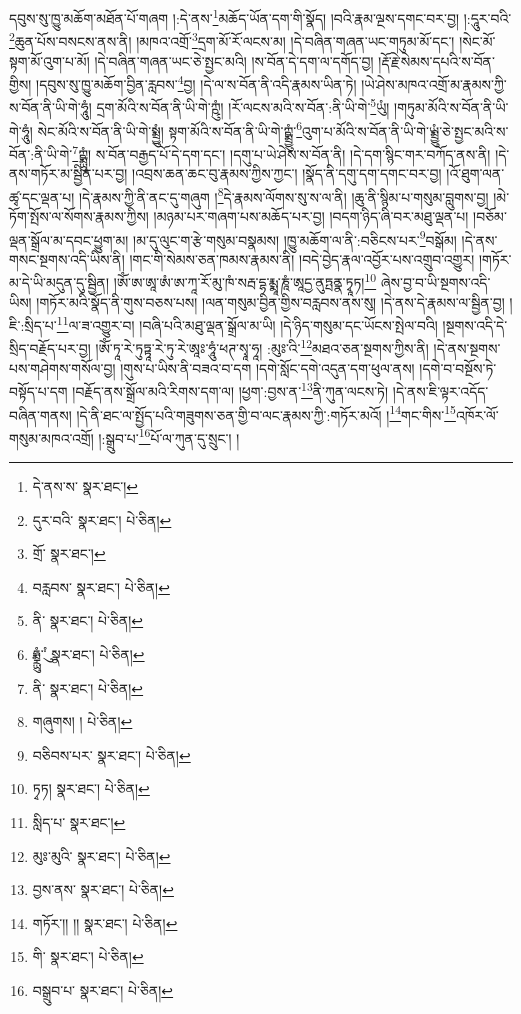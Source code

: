 དབུས་སུ་ཁྱུ་མཆོག་མཐོན་པོ་གཞག །:དེ་ནས་\footnote{དེ་ནས་ས་  སྣར་ཐང་། }མཆོད་ཡོན་དག་གི་སྣོད། །བའི་རྣམ་ལྔས་དགང་བར་བྱ། །:དཱུར་བའི་\footnote{དུར་བའི་  སྣར་ཐང་།  པེ་ཅིན། }ཆུན་པོས་བསངས་ནས་ནི། །མཁའ་འགྲོ་\footnote{གྲོ་  སྣར་ཐང་། }དྲག་མོ་རོ་ལངས་མ། །དེ་བཞིན་གཞན་ཡང་གཏུམ་མོ་དང་། །སེང་མོ་སྟག་མོ་འུག་པ་མོ། །དེ་བཞིན་གཞན་ཡང་ཅེ་སྤྱང་མའི། །ས་བོན་དེ་དག་ལ་དགོད་བྱ། །རྡོ་རྗེ་སེམས་དཔའི་ས་བོན་གྱིས། །དབུས་སུ་ཁྱུ་མཆོག་བྱིན་རླབས་\footnote{བརླབས་  སྣར་ཐང་།  པེ་ཅིན། }བྱ། །དེ་ལ་ས་བོན་ནི་འདི་རྣམས་ཡིན་ཏེ། །ཡེ་ཤེས་མཁའ་འགྲོ་མ་རྣམས་ཀྱི་ས་བོན་ནི་ཡི་གེ་ཧཱུཾ། དྲག་མོའི་ས་བོན་ནི་ཡི་གེ་ཀྵུཾ། །རོ་ལངས་མའི་ས་བོན་:ནི་ཡི་གེ་\footnote{ནི་  སྣར་ཐང་།  པེ་ཅིན། }ཡུཾ། །གཏུམ་མོའི་ས་བོན་ནི་ཡི་གེ་ཧཱུཾ། སེང་མོའི་ས་བོན་ནི་ཡི་གེ་སྨྲྱུཾ། སྟག་མོའི་ས་བོན་ནི་ཡི་གེ་ཀྵྨྲྱུཾ་\footnote{ཧྨྼྻུཾ་ུཾ་  སྣར་ཐང་།  པེ་ཅིན། }འུག་པ་མོའི་ས་བོན་ནི་ཡི་གེ་ཡྨྲྱུཾ་ཅེ་སྤྱང་མའི་ས་བོན་:ནི་ཡི་གེ་\footnote{ནི་  སྣར་ཐང་།  པེ་ཅིན། }ཀྵྨྻུཾ། ས་བོན་བརྒྱད་པོ་དེ་དག་དང་། །དགུ་པ་ཡེ་ཤེས་ས་བོན་ནི། །དེ་དག་སྙིང་གར་བཀོད་ནས་ནི། །དེ་ནས་གཏོར་མ་སྦྱིན་པར་བྱ། །འབྲས་ཆན་ཆང་བུ་རྣམས་ཀྱིས་ཀྱང་། །སྣོད་ནི་དགུ་དག་དགང་བར་བྱ། །འོ་ཐུག་ལན་ཚྭ་དང་ལྡན་པ། །དེ་རྣམས་ཀྱི་ནི་ནང་དུ་གཞུག །\footnote{གཞུགས། །  པེ་ཅིན། }དེ་རྣམས་ལོགས་སུ་ས་ལ་ནི། །ཆུ་ནི་སྙིམ་པ་གསུམ་བླུགས་བྱ། །མེ་ཏོག་སྤོས་ལ་སོགས་རྣམས་ཀྱིས། །མཉམ་པར་གཞག་པས་མཆོད་པར་བྱ། །བདག་ཉིད་ཞི་བར་མཐུ་ལྡན་པ། །བཅོམ་ལྡན་སྒྲོལ་མ་དབང་ཕྱུག་མ། །མ་དུ་ལུང་ག་རྩེ་གསུམ་བསྣམས། །ཁྱུ་མཆོག་ལ་ནི་:བཅིངས་པར་\footnote{བཅིབས་པར་  སྣར་ཐང་།  པེ་ཅིན། }བསྒོམ། །དེ་ནས་གསང་སྔགས་འདི་ཡིས་ནི། །གང་གི་སེམས་ཅན་ཁམས་རྣམས་ནི། །བདེ་བྱེད་རྣལ་འབྱོར་པས་འགྲུབ་འགྱུར། །གཏོར་མ་དེ་ཡི་མདུན་དུ་སྦྱིན། །ཨོཾ་ཨ་ཨཱ་ཨཾ་ཨ་ཀཱ་རོ་མུ་ཁཾ་སརྦ་དྷ་རྨྨཱ་ཎཱཾ་ཨཱདྱ་ནུཏྤནྣ་ཏྭཱཏ།\footnote{ཏྭཏ།  སྣར་ཐང་།  པེ་ཅིན། } ཞེས་བྱ་བ་ཡི་སྔགས་འདི་ཡིས། །གཏོར་མའི་སྣོད་ནི་གུས་བཅས་པས། །ལན་གསུམ་བྱིན་གྱིས་བརླབས་ནས་སུ། །དེ་ནས་དེ་རྣམས་ལ་སྦྱིན་བྱ། །ཇི་:སྲིད་པ་\footnote{སླིད་པ་  སྣར་ཐང་། }ལ་ཟ་འགྱུར་བ། །བཞི་པའི་མཐུ་ལྡན་སྒྲོལ་མ་ཡི། །དེ་ཉིད་གསུམ་དང་ཡོངས་སྤེལ་བའི། །སྔགས་འདི་དེ་སྲིད་བརྗོད་པར་བྱ། །ཨོཾ་ཏཱ་རེ་ཏུཏྟཱ་རེ་ཏུ་རེ་ཨཱཿ་ཧཱུཾ་ཕཊ་སྭཱ་ཧཱ། :མུཿ་འི་\footnote{མུཿ་མུའི་  སྣར་ཐང་།  པེ་ཅིན། }མཐའ་ཅན་སྔགས་ཀྱིས་ནི། །དེ་ནས་སྔགས་པས་གཤེགས་གསོལ་བྱ། །གུས་པ་ཡིས་ནི་བཟའ་བ་དག །དགེ་སློང་དགེ་འདུན་དག་ཕུལ་ནས། །དགེ་བ་བསྔོས་ཏེ་བསྟོད་པ་དག །བརྗོད་ནས་སྒྲོལ་མའི་རིགས་དག་ལ། །ཕྱག་:བྱས་ན་\footnote{བྱས་ནས་  སྣར་ཐང་།  པེ་ཅིན། }ནི་ཀུན་ལངས་ཏེ། །དེ་ནས་ཇི་ལྟར་འདོད་བཞིན་གནས། །དེ་ནི་ཐང་ལ་སྤྱོད་པའི་གཟུགས་ཅན་གྱི་བ་ལང་རྣམས་ཀྱི་:གཏོར་མའོ། །\footnote{གཏོར་།། །།  སྣར་ཐང་།  པེ་ཅིན། }གང་གིས་\footnote{གི་  སྣར་ཐང་།  པེ་ཅིན། }འཁོར་ལོ་གསུམ་མཁའ་འགྲོ། །:སྒྲུབ་པ་\footnote{བསྒྲུབ་པ་  སྣར་ཐང་།  པེ་ཅིན། }པོ་ལ་ཀུན་དུ་སྲུང་། །
